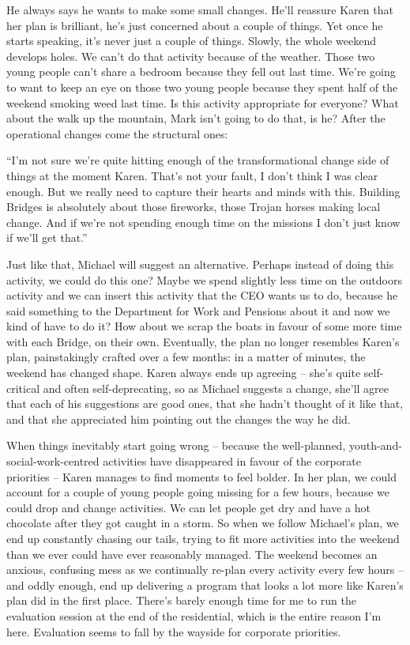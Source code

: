 He always says he wants to make some small changes. He'll reassure Karen that her plan is brilliant, he’s just concerned about a couple of things. Yet once he starts speaking, it’s never just a couple of things. Slowly, the whole weekend develops holes. We can’t do that activity because of the weather. Those two young people can’t share a bedroom because they fell out last time. We’re going to want to keep an eye on those two young people because they spent half of the weekend smoking weed last time. Is this activity appropriate for everyone? What about the walk up the mountain, Mark isn’t going to do that, is he? After the operational changes come the structural ones:

“I’m not sure we’re quite hitting enough of the transformational change side of things at the moment Karen. That’s not your fault, I don’t think I was clear enough. But we really need to capture their hearts and minds with this. Building Bridges is absolutely about those fireworks, those Trojan horses making local change. And if we’re not spending enough time on the missions I don’t just know if we’ll get that.”

Just like that, Michael will suggest an alternative. Perhaps instead of doing this activity, we could do this one? Maybe we spend slightly less time on the outdoors activity and we can insert this activity that the CEO wants us to do, because he said something to the Department for Work and Pensions about it and now we kind of have to do it? How about we scrap the boats in favour of some more time with each Bridge, on their own. Eventually, the plan no longer resembles Karen’s plan, painstakingly crafted over a few months: in a matter of minutes, the weekend has changed shape. Karen always ends up agreeing – she’s quite self-critical and often self-deprecating, so as Michael suggests a change, she’ll agree that each of his suggestions are good ones, that she hadn’t thought of it like that, and that she appreciated him pointing out the changes the way he did. 

When things inevitably start going wrong – because the well-planned, youth-and-social-work-centred activities have disappeared in favour of the corporate priorities – Karen manages to find moments to feel bolder. In her plan, we could account for a couple of young people going missing for a few hours, because we could drop and change activities. We can let people get dry and have a hot chocolate after they got caught in a storm. So when we follow Michael’s plan, we end up constantly chasing our tails, trying to fit more activities into the weekend than we ever could have ever reasonably managed. The weekend becomes an anxious, confusing mess as we continually re-plan every activity every few hours – and oddly enough, end up delivering a program that looks a lot more like Karen’s plan did in the first place. There’s barely enough time for me to run the evaluation session at the end of the residential, which is the entire reason I’m here. Evaluation seems to fall by the wayside for corporate priorities. 

